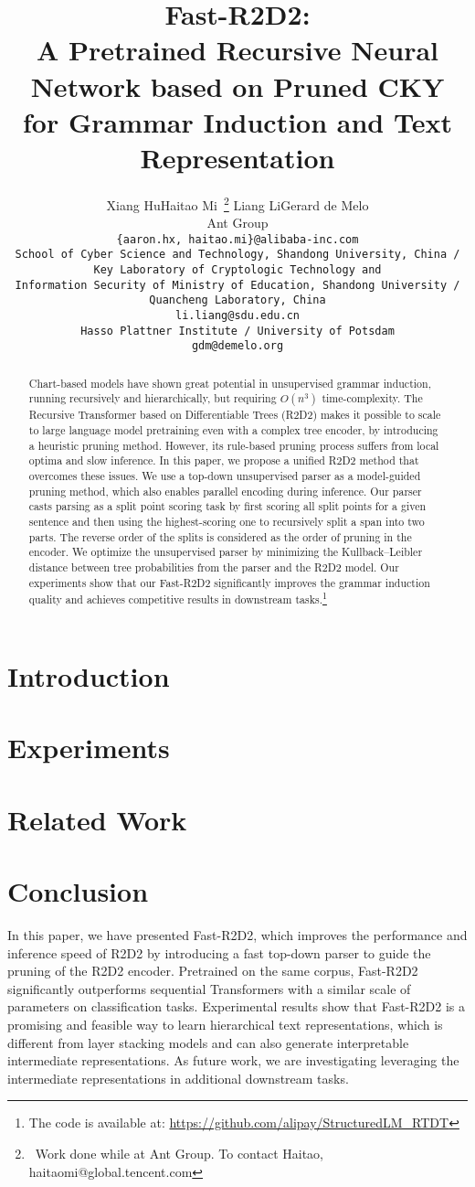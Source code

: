\documentclass[11pt,a4paper]{article}
\title{Fast-R2D2:\vspace{-0.2ex} \\
A Pretrained Recursive Neural Network based on Pruned CKY\vspace{-0.2ex} \\
for Grammar Induction and Text Representation\vspace{-0.85ex}}
\date{}
\author{Xiang Hu\footnotemark[2] \quad Haitao Mi\footnotemark[2]~\thanks{~Work done while at Ant Group. To contact Haitao, haitaomi@global.tencent.com} \quad Liang Li\footnotemark[3] \quad Gerard de Melo\footnotemark[4] \\
 Ant Group\footnotemark[2] \\
 \tt \{aaron.hx, haitao.mi\}@alibaba-inc.com\footnotemark[2] \\
 School of Cyber Science and Technology, Shandong University, China /\\
 Key Laboratory of Cryptologic Technology and \\
 Information Security of Ministry of Education, Shandong University /\\Quancheng Laboratory, China\footnotemark[3]\\ 
 \tt li.liang@sdu.edu.cn\footnotemark[3] \\
 Hasso Plattner Institute / University of Potsdam\footnotemark[4] \\
 \tt gdm@demelo.org\footnotemark[4]  \\}
\begin{document}
\maketitle
\begin{abstract}
Chart-based models have shown great potential in unsupervised grammar induction, running recursively and hierarchically, 
but requiring $O(n^3)$ time-complexity.
The Recursive Transformer based on Differentiable Trees (R2D2) makes it possible to scale to large language model pretraining
even with a complex tree encoder, by introducing a heuristic pruning method.
However, its rule-based pruning process suffers from local optima and slow inference. 
In this paper, we propose a unified R2D2 method that overcomes these issues. 
We use a top-down unsupervised parser as a model-guided pruning method, 
which also enables parallel encoding during inference.
Our parser casts parsing as a split point scoring task by first scoring all split points for a given sentence and then 
using the highest-scoring one to recursively split a span into two parts.
The reverse order of the splits is considered as the order 
of pruning in the encoder.
We optimize the unsupervised parser by minimizing the Kullback–Leibler distance between tree probabilities from the parser and the R2D2 model.
Our experiments show that 
our Fast-R2D2 significantly improves the grammar induction 
quality and achieves competitive results in downstream 
tasks.\footnote{The code is available at: \url{https://github.com/alipay/StructuredLM\_RTDT}}
\end{abstract}

\section{Introduction}




\section{Experiments}
\label{sec:exps}


\section{Related Work}
\label{sec:related_works}


\section{Conclusion}
In this paper, we have presented Fast-R2D2, which improves the performance and inference speed of R2D2 by introducing a fast top-down parser to guide the pruning of the R2D2 encoder.
Pretrained on the same corpus, Fast-R2D2 significantly outperforms sequential Transformers with a similar scale of parameters on classification tasks. 
Experimental results show that Fast-R2D2 is a promising and feasible way to learn hierarchical text representations, which is different from layer stacking models and can also generate interpretable intermediate representations.
As future work, we are investigating leveraging the intermediate representations in additional downstream tasks.
\end{document}
